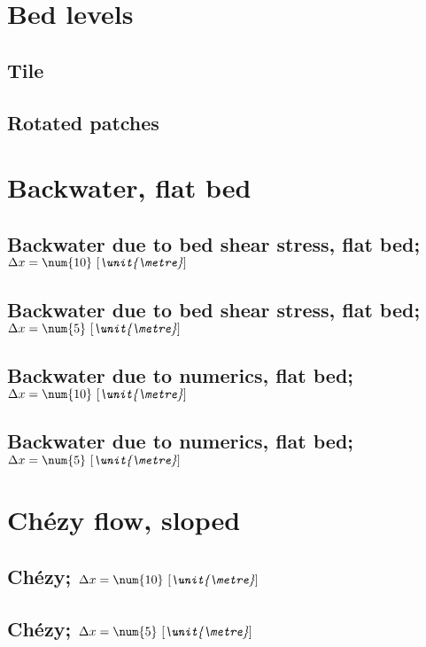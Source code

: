 \documentclass{mooiman_report}
\newcommand{\Dx}{\Delta x}
\newcommand{\bqty}[2]{\text{\num{#1}}\ \text{\normalfont [}\textit{\unit{#2}}\text{\normalfont ]}}
\begin{document}

    \mooimantitle

\section{Bed levels}
\subsection{Tile}
\subsection{Rotated patches}

\section{Backwater, flat bed}
\subsection{Backwater due to bed shear stress, flat bed; $\Dx=\bqty{10}{\metre}$}
\subsection{Backwater due to bed shear stress, flat bed; $\Dx=\bqty{5}{\metre}$}
\subsection{Backwater due to numerics, flat bed; $\Dx=\bqty{10}{\metre}$}
\subsection{Backwater due to numerics, flat bed; $\Dx=\bqty{5}{\metre}$}

\section{Ch\'ezy flow, sloped}
\subsection{Ch\'ezy; $\Dx=\bqty{10}{\metre}$}
\subsection{Ch\'ezy; $\Dx=\bqty{5}{\metre}$}
\end{document}
